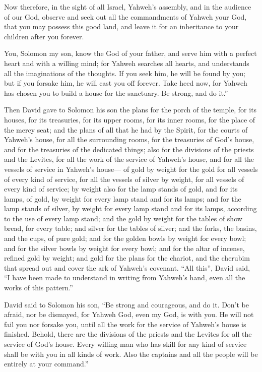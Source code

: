  Now therefore, in the sight of all Israel, Yahweh's
assembly, and in the audience of our God, observe and seek out all the
commandments of Yahweh your God, that you may possess this good land,
and leave it for an inheritance to your children after you forever.

 You, Solomon my son, know the God of your father, and
serve him with a perfect heart and with a willing mind; for Yahweh
searches all hearts, and understands all the imaginations of the
thoughts. If you seek him, he will be found by you; but if you forsake
him, he will cast you off forever.  Take heed now, for
Yahweh has chosen you to build a house for the sanctuary. Be strong, and
do it.''

 Then David gave to Solomon his son the plans for the
porch of the temple, for its houses, for its treasuries, for its upper
rooms, for its inner rooms, for the place of the mercy seat;
 and the plans of all that he had by the Spirit, for the
courts of Yahweh's house, for all the surrounding rooms, for the
treasuries of God's house, and for the treasuries of the dedicated
things;  also for the divisions of the priests and the
Levites, for all the work of the service of Yahweh's house, and for all
the vessels of service in Yahweh's house---  of gold by
weight for the gold for all vessels of every kind of service, for all
the vessels of silver by weight, for all vessels of every kind of
service;  by weight also for the lamp stands of gold, and
for its lamps, of gold, by weight for every lamp stand and for its
lamps; and for the lamp stands of silver, by weight for every lamp stand
and for its lamps, according to the use of every lamp stand;
 and the gold by weight for the tables of show bread, for
every table; and silver for the tables of silver;  and
the forks, the basins, and the cups, of pure gold; and for the golden
bowls by weight for every bowl; and for the silver bowls by weight for
every bowl;  and for the altar of incense, refined gold
by weight; and gold for the plans for the chariot, and the cherubim that
spread out and cover the ark of Yahweh's covenant.  ``All
this'', David said, ``I have been made to understand in writing from
Yahweh's hand, even all the works of this pattern.''

 David said to Solomon his son, ``Be strong and
courageous, and do it. Don't be afraid, nor be dismayed, for Yahweh God,
even my God, is with you. He will not fail you nor forsake you, until
all the work for the service of Yahweh's house is finished.
 Behold, there are the divisions of the priests and the
Levites for all the service of God's house. Every willing man who has
skill for any kind of service shall be with you in all kinds of work.
Also the captains and all the people will be entirely at your command.''

